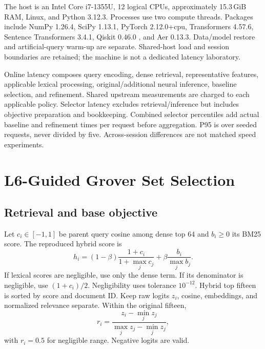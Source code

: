 \documentclass[conference]{IEEEtran}
\begin{document}
The host is an Intel Core i7-1355U, 12 logical CPUs, approximately 15.3\,GiB RAM, Linux, and Python 3.12.3. Processes use two compute threads. Packages include NumPy 1.26.4, SciPy 1.13.1, PyTorch 2.12.0+cpu, Transformers 4.57.6, Sentence Transformers 3.4.1, Qiskit 0.46.0 \cite{javadi2024qiskit}, and Aer 0.13.3. Data/model restore and artificial-query warm-up are separate. Shared-host load and session boundaries are retained; the machine is not a dedicated latency laboratory.

Online latency composes query encoding, dense retrieval, representative features, applicable lexical processing, original/additional neural inference, baseline selection, and refinement. Shared upstream measurements are charged to each applicable policy. Selector latency excludes retrieval/inference but includes objective preparation and bookkeeping. Combined selector percentiles add actual baseline and refinement times per request before aggregation. P95 is over seeded requests, never divided by five. Across-session differences are not matched speed experiments.

\section{L6-Guided Grover Set Selection}\label{sec:method}
\subsection{Retrieval and base objective}
Let \(c_i\in[-1,1]\) be parent query cosine among dense top 64 and \(b_i\geq0\) its BM25 score. The reproduced hybrid score is
\begin{equation}
h_i=(1-\beta)\frac{1+c_i}{1+\max_jc_j}+\beta\frac{b_i}{\max_jb_j}.\label{eq:hybrid}
\end{equation}
If lexical scores are negligible, use only the dense term. If its denominator is negligible, use \((1+c_i)/2\). Negligibility uses tolerance \(10^{-12}\). Hybrid top fifteen is sorted by score and document ID. Keep raw logits \(z_i\), cosine, embeddings, and normalized relevance separate. Within the original fifteen,
\begin{equation}
r_i=\frac{z_i-\min_jz_j}{\max_jz_j-\min_jz_j},\label{eq:relevance}
\end{equation}
with \(r_i=0.5\) for negligible range. Negative logits are valid.
\end{document}
